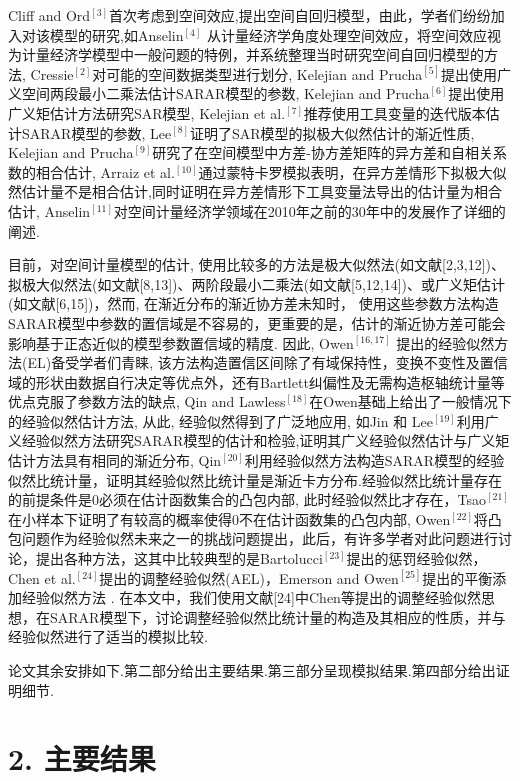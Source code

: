 \documentclass[onecolumn]{ctexart}	%
\begin{document}
Cliff and Ord$^{[3]}$首次考虑到空间效应,提出空间自回归模型，由此，学者们纷纷加入对该模型的研究,如Anselin$^{[4]}$ 从计量经济学角度处理空间效应，将空间效应视为计量经济学模型中一般问题的特例，并系统整理当时研究空间自回归模型的方法, Cressie$^{[2]}$对可能的空间数据类型进行划分,  Kelejian and Prucha$^{[5]}$提出使用广义空间两段最小二乘法估计SARAR模型的参数, Kelejian and Prucha$^{[6]}$提出使用广义矩估计方法研究SAR模型, Kelejian et al.$^{[7]}$推荐使用工具变量的迭代版本估计SARAR模型的参数, Lee$^{[8]}$证明了SAR模型的拟极大似然估计的渐近性质, Kelejian and Prucha$^{[9]}$研究了在空间模型中方差-协方差矩阵的异方差和自相关系数的相合估计, Arraiz et al.$^{[10]}$通过蒙特卡罗模拟表明，在异方差情形下拟极大似然估计量不是相合估计,同时证明在异方差情形下工具变量法导出的估计量为相合估计, Anselin$^{[11]}$对空间计量经济学领域在2010年之前的30年中的发展作了详细的阐述.

目前，对空间计量模型的估计, 使用比较多的方法是极大似然法(如文献[2,3,12])、拟极大似然法(如文献[8,13])、两阶段最小二乘法(如文献[5,12,14])、或广义矩估计(如文献[6,15])，然而, 在渐近分布的渐近协方差未知时， 使用这些参数方法构造SARAR模型中参数的置信域是不容易的，更重要的是，估计的渐近协方差可能会影响基于正态近似的模型参数置信域的精度. 因此, Owen$^{[16,17]}$ 提出的经验似然方法(EL)备受学者们青睐, 该方法构造置信区间除了有域保持性，变换不变性及置信域的形状由数据自行决定等优点外，还有Bartlett纠偏性及无需构造枢轴统计量等优点克服了参数方法的缺点, Qin and Lawless$^{[18]}$在Owen基础上给出了一般情况下的经验似然估计方法, 从此, 经验似然得到了广泛地应用, 如Jin 和 Lee$^{[19]}$利用广义经验似然方法研究SARAR模型的估计和检验,证明其广义经验似然估计与广义矩估计方法具有相同的渐近分布, Qin$^{[20]}$利用经验似然方法构造SARAR模型的经验似然比统计量，证明其经验似然比统计量是渐近卡方分布.经验似然比统计量存在的前提条件是0必须在估计函数集合的凸包内部, 此时经验似然比才存在，Tsao$^{[21]}$在小样本下证明了有较高的概率使得0不在估计函数集的凸包内部, Owen$^{[22]}$将凸包问题作为经验似然未来之一的挑战问题提出，此后，有许多学者对此问题进行讨论，提出各种方法，这其中比较典型的是Bartolucci$^{[23]}$提出的惩罚经验似然，Chen et al.$^{[24]}$提出的调整经验似然(AEL)，Emerson and Owen$^{[25]}$提出的平衡添加经验似然方法 . 在本文中，我们使用文献[24]中Chen等提出的调整经验似然思想，在SARAR模型下，讨论调整经验似然比统计量的构造及其相应的性质，并与经验似然进行了适当的模拟比较.  

论文其余安排如下.第二部分给出主要结果.第三部分呈现模拟结果.第四部分给出证明细节.

\section*{2. 主要结果}
\end{document}
